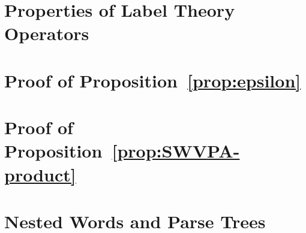 \section{Properties of Label Theory Operators} \label{sec:closure}


\section{Proof of Proposition~\ref{prop:epsilon}} \label{sec:closure}


\section{Proof of Proposition~\ref{prop:SWVPA-product}} \label{sec:product}


%

\section{Nested Words and Parse Trees} \label{sec:trees}\label{app:trees}






